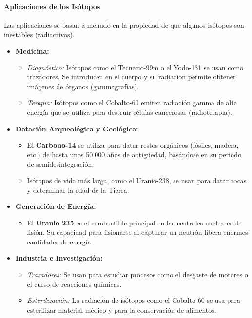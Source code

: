 \paragraph*{Aplicaciones de los Isótopos}
Las aplicaciones se basan a menudo en la propiedad de que algunos isótopos son inestables (radiactivos).
\begin{itemize}
    \item \textbf{Medicina:}
    \begin{itemize}
        \item \textit{Diagnóstico:} Isótopos como el Tecnecio-99m o el Yodo-131 se usan como trazadores. Se introducen en el cuerpo y su radiación permite obtener imágenes de órganos (gammagrafías).
        \item \textit{Terapia:} Isótopos como el Cobalto-60 emiten radiación gamma de alta energía que se utiliza para destruir células cancerosas (radioterapia).
    \end{itemize}
    \item \textbf{Datación Arqueológica y Geológica:}
    \begin{itemize}
        \item El \textbf{Carbono-14} se utiliza para datar restos orgánicos (fósiles, madera, etc.) de hasta unos 50.000 años de antigüedad, basándose en su periodo de semidesintegración.
        \item Isótopos de vida más larga, como el Uranio-238, se usan para datar rocas y determinar la edad de la Tierra.
    \end{itemize}
    \item \textbf{Generación de Energía:}
    \begin{itemize}
        \item El \textbf{Uranio-235} es el combustible principal en las centrales nucleares de fisión. Su capacidad para fisionarse al capturar un neutrón libera enormes cantidades de energía.
    \end{itemize}
    \item \textbf{Industria e Investigación:}
    \begin{itemize}
        \item \textit{Trazadores:} Se usan para estudiar procesos como el desgaste de motores o el curso de reacciones químicas.
        \item \textit{Esterilización:} La radiación de isótopos como el Cobalto-60 se usa para esterilizar material médico y para la conservación de alimentos.
    \end{itemize}
\end{itemize}

